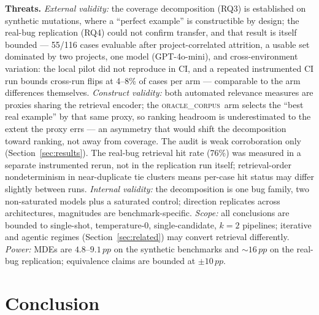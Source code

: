 \documentclass[10pt,conference,a4paper]{IEEEtran}
\newcommand{\oraclecorpus}{\textsc{oracle\_corpus}\xspace}
\newcommand{\pp}{\,pp}
\begin{document}
\textbf{Threats.} \emph{External validity:} the coverage decomposition
(RQ3) is established on synthetic mutations, where a ``perfect example'' is
constructible by design; the real-bug replication (RQ4) could not confirm
transfer, and that result is itself bounded --- 55/116 cases evaluable
after project-correlated attrition, a usable set dominated by two projects,
one model (GPT-4o-mini), and cross-environment variation: the local pilot
did not reproduce in CI, and a repeated instrumented CI run bounds
cross-run flips at 4--8\% of cases per arm --- comparable to the arm
differences themselves. \emph{Construct validity:}
both automated relevance measures are proxies sharing the retrieval
encoder; the \oraclecorpus\ arm selects the ``best real example'' by that
same proxy, so ranking headroom is underestimated to the extent the proxy
errs --- an asymmetry that would shift the decomposition toward ranking,
not away from coverage. The audit is weak corroboration only
(Section~\ref{sec:results}). The real-bug retrieval hit rate (76\%) was
measured in a separate instrumented rerun, not in the replication run
itself; retrieval-order nondeterminism in near-duplicate tie clusters
means per-case hit status may differ slightly between runs.
\emph{Internal validity:} the decomposition is one bug family, two
non-saturated models plus a saturated control; direction replicates across
architectures, magnitudes are benchmark-specific. \emph{Scope:} all
conclusions are bounded to single-shot, temperature-0, single-candidate,
$k{=}2$ pipelines; iterative and agentic regimes
(Section~\ref{sec:related}) may convert retrieval differently.
\emph{Power:} MDEs are $4.8$--$9.1\pp$ on the synthetic benchmarks and
${\sim}16\pp$ on the real-bug replication; equivalence claims are bounded
at $\pm 10\pp$.

\section{Conclusion}
\label{sec:conclusion}
\end{document}
